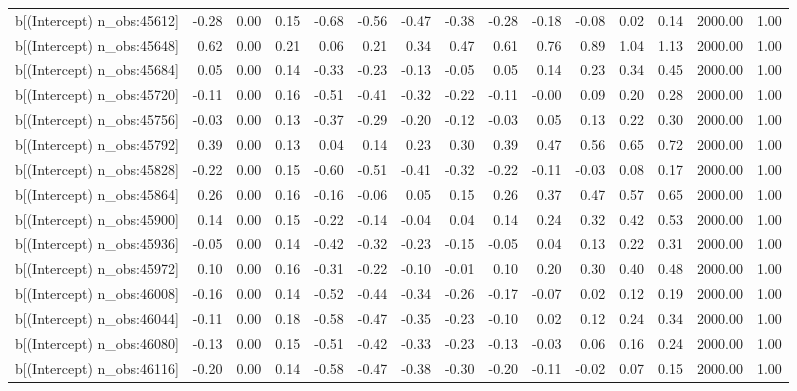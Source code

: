 \begin{table}[ht]
\begin{tabular}{rrrrrrrrrrrrrrr}
  b[(Intercept) n\_obs:45612] & -0.28 & 0.00 & 0.15 & -0.68 & -0.56 & -0.47 & -0.38 & -0.28 & -0.18 & -0.08 & 0.02 & 0.14 & 2000.00 & 1.00 \\ 
  b[(Intercept) n\_obs:45648] & 0.62 & 0.00 & 0.21 & 0.06 & 0.21 & 0.34 & 0.47 & 0.61 & 0.76 & 0.89 & 1.04 & 1.13 & 2000.00 & 1.00 \\ 
  b[(Intercept) n\_obs:45684] & 0.05 & 0.00 & 0.14 & -0.33 & -0.23 & -0.13 & -0.05 & 0.05 & 0.14 & 0.23 & 0.34 & 0.45 & 2000.00 & 1.00 \\ 
  b[(Intercept) n\_obs:45720] & -0.11 & 0.00 & 0.16 & -0.51 & -0.41 & -0.32 & -0.22 & -0.11 & -0.00 & 0.09 & 0.20 & 0.28 & 2000.00 & 1.00 \\ 
  b[(Intercept) n\_obs:45756] & -0.03 & 0.00 & 0.13 & -0.37 & -0.29 & -0.20 & -0.12 & -0.03 & 0.05 & 0.13 & 0.22 & 0.30 & 2000.00 & 1.00 \\ 
  b[(Intercept) n\_obs:45792] & 0.39 & 0.00 & 0.13 & 0.04 & 0.14 & 0.23 & 0.30 & 0.39 & 0.47 & 0.56 & 0.65 & 0.72 & 2000.00 & 1.00 \\ 
  b[(Intercept) n\_obs:45828] & -0.22 & 0.00 & 0.15 & -0.60 & -0.51 & -0.41 & -0.32 & -0.22 & -0.11 & -0.03 & 0.08 & 0.17 & 2000.00 & 1.00 \\ 
  b[(Intercept) n\_obs:45864] & 0.26 & 0.00 & 0.16 & -0.16 & -0.06 & 0.05 & 0.15 & 0.26 & 0.37 & 0.47 & 0.57 & 0.65 & 2000.00 & 1.00 \\ 
  b[(Intercept) n\_obs:45900] & 0.14 & 0.00 & 0.15 & -0.22 & -0.14 & -0.04 & 0.04 & 0.14 & 0.24 & 0.32 & 0.42 & 0.53 & 2000.00 & 1.00 \\ 
  b[(Intercept) n\_obs:45936] & -0.05 & 0.00 & 0.14 & -0.42 & -0.32 & -0.23 & -0.15 & -0.05 & 0.04 & 0.13 & 0.22 & 0.31 & 2000.00 & 1.00 \\ 
  b[(Intercept) n\_obs:45972] & 0.10 & 0.00 & 0.16 & -0.31 & -0.22 & -0.10 & -0.01 & 0.10 & 0.20 & 0.30 & 0.40 & 0.48 & 2000.00 & 1.00 \\ 
  b[(Intercept) n\_obs:46008] & -0.16 & 0.00 & 0.14 & -0.52 & -0.44 & -0.34 & -0.26 & -0.17 & -0.07 & 0.02 & 0.12 & 0.19 & 2000.00 & 1.00 \\ 
  b[(Intercept) n\_obs:46044] & -0.11 & 0.00 & 0.18 & -0.58 & -0.47 & -0.35 & -0.23 & -0.10 & 0.02 & 0.12 & 0.24 & 0.34 & 2000.00 & 1.00 \\ 
  b[(Intercept) n\_obs:46080] & -0.13 & 0.00 & 0.15 & -0.51 & -0.42 & -0.33 & -0.23 & -0.13 & -0.03 & 0.06 & 0.16 & 0.24 & 2000.00 & 1.00 \\ 
  b[(Intercept) n\_obs:46116] & -0.20 & 0.00 & 0.14 & -0.58 & -0.47 & -0.38 & -0.30 & -0.20 & -0.11 & -0.02 & 0.07 & 0.15 & 2000.00 & 1.00 \\ 

\end{tabular}
\end{table}
